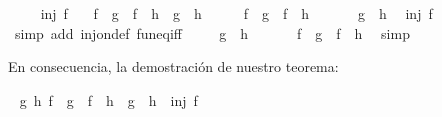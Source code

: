 \begin{isabellebody}
\isamarkupfalse%
\ \isanewline
\ \ \ {\isachardoublequoteopen}inj\ f{\isachardoublequoteclose}\isanewline
\ \ \ {\isachardoublequoteopen}{\isacharparenleft}f\ {\isasymcirc}\ g\ {\isacharequal}\ f\ {\isasymcirc}\ h{\isacharparenright}\ {\isacharequal}\ {\isacharparenleft}g\ {\isacharequal}\ h{\isacharparenright}{\isachardoublequoteclose}\isanewline
%
\isadelimproof
%
\endisadelimproof
%
\isatagproof
{}\isamarkupfalse%
\ \isanewline
\ \ \isamarkupfalse%
\ {\isachardoublequoteopen}f\ {\isasymcirc}\ g\ {\isacharequal}\ f\ {\isasymcirc}\ h{\isachardoublequoteclose}\ \isanewline
\ \ \isamarkupfalse%
\ \isamarkupfalse%
\ {\isachardoublequoteopen}g\ {\isacharequal}\ h{\isachardoublequoteclose}\ \isamarkupfalse%
\ {\isacharbackquoteopen}inj\ f{\isacharbackquoteclose}\ \isamarkupfalse%
\ {\isacharparenleft}simp\ add{\isacharcolon}\ inj{\isacharunderscore}on{\isacharunderscore}def\ fun{\isacharunderscore}eq{\isacharunderscore}iff{\isacharparenright}\ \isanewline
{}\isamarkupfalse%
\isanewline
\ \ \isamarkupfalse%
\ {\isachardoublequoteopen}g\ {\isacharequal}\ h{\isachardoublequoteclose}\ \isanewline
\ \ \isamarkupfalse%
\ \isamarkupfalse%
\ {\isachardoublequoteopen}f\ {\isasymcirc}\ g\ {\isacharequal}\ f\ {\isasymcirc}\ h{\isachardoublequoteclose}\ \isamarkupfalse%
\ simp\isanewline
{}\isamarkupfalse%
%
\endisatagproof
{\isafoldproof}%
%
\isadelimproof
%
\endisadelimproof
%
\begin{isamarkuptext}%
En consecuencia, la demostración de nuestro teorema:%
\end{isamarkuptext}\isamarkuptrue%
\isamarkupfalse%
\ \isanewline
{\isachardoublequoteopen}{\isasymforall}g\ h{\isachardot}\ {\isacharparenleft}f\ {\isasymcirc}\ g\ {\isacharequal}\ f\ {\isasymcirc}\ h\ {\isasymlongrightarrow}\ g\ {\isacharequal}\ h{\isacharparenright}\ {\isasymlongleftrightarrow}\ inj\ f{\isachardoublequoteclose}\isanewline
%
\isadelimproof
\ \ %
\endisadelimproof
%
\isatagproof
{}\isamarkupfalse%
\isanewline
%
\endisatagproof
{\isafoldproof}%
%
\isadelimproof
%
\endisadelimproof
%
\isadelimtheory
%
\endisadelimtheory
%
\isatagtheory
%
\endisatagtheory
{\isafoldtheory}%
%
\isadelimtheory
%
\endisadelimtheory
%
\end{isabellebody}%
\endinput
